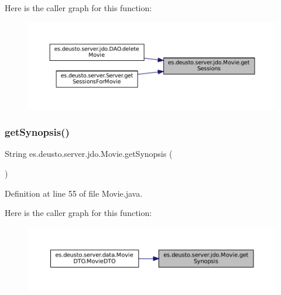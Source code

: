 Here is the caller graph for this function\+:\nopagebreak
\begin{figure}[H]
\begin{center}
\leavevmode
\includegraphics[width=350pt]{classes_1_1deusto_1_1server_1_1jdo_1_1_movie_a8d94f72339ed5601515e139de313e181_icgraph}
\end{center}
\end{figure}
\mbox{\label{classes_1_1deusto_1_1server_1_1jdo_1_1_movie_a3cd6a8dbcfc02f646bb21d212030dbeb}} 
\subsubsection{\texorpdfstring{getSynopsis()}{getSynopsis()}}
{\footnotesize\ttfamily String es.\+deusto.\+server.\+jdo.\+Movie.\+get\+Synopsis (\begin{DoxyParamCaption}{ }\end{DoxyParamCaption})}



Definition at line 55 of file Movie.\+java.

Here is the caller graph for this function\+:\nopagebreak
\begin{figure}[H]
\begin{center}
\leavevmode
\includegraphics[width=350pt]{classes_1_1deusto_1_1server_1_1jdo_1_1_movie_a3cd6a8dbcfc02f646bb21d212030dbeb_icgraph}
\end{center}
\end{figure}
\mbox{\label{classes_1_1deusto_1_1server_1_1jdo_1_1_movie_aa69d66c8aa0135b6ae9b809cf0692389}} 
